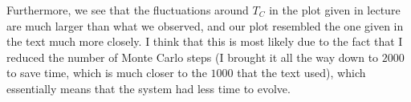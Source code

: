 \begin{qBox}{1}
\baseSkip

Furthermore, we see that the fluctuations around \( T_{ C } \) in the plot given in 
lecture are much larger than what we observed, and our plot resembled the one given 
in the text much more closely.
I think that this is most likely due to the fact that I reduced the number of Monte 
Carlo steps (I brought it all the way down to \( 2000 \) to save time, which is much 
closer to the \( 1000 \) that the text used), which essentially means that the system 
had less time to evolve. 
\end{qBox}
